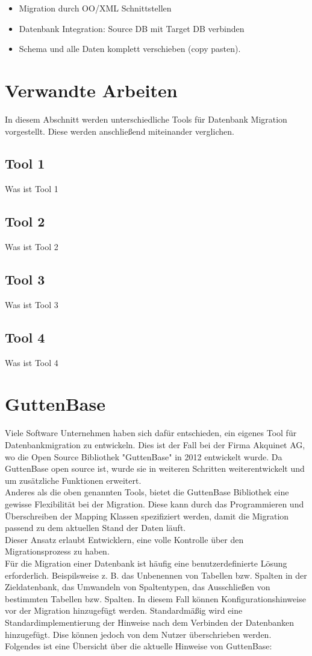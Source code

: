 \begin{itemize}
	\item Migration durch OO/XML Schnittstellen
	\item Datenbank Integration: Source DB mit Target DB verbinden
	\item Schema und alle Daten komplett verschieben (copy pasten).
\end{itemize}


\section{Verwandte Arbeiten}
In diesem Abschnitt werden unterschiedliche Tools für Datenbank Migration vorgestellt. Diese werden anschließend miteinander verglichen.
\subsection{Tool 1}
Was ist Tool 1
\subsection{Tool 2}
Was ist Tool 2
\subsection{Tool 3}
Was ist Tool 3
\subsection{Tool 4}
Was ist Tool 4


\section{GuttenBase}
Viele Software Unternehmen haben sich dafür entschieden, ein eigenes Tool für Datenbankmigration zu entwickeln. Dies ist der Fall bei der Firma Akquinet AG, wo die Open Source Bibliothek "GuttenBase" in 2012 entwickelt wurde. Da GuttenBase open source ist, wurde sie in weiteren Schritten weiterentwickelt und um zusätzliche Funktionen erweitert.\\
Anderes als die oben genannten Tools, bietet die GuttenBase Bibliothek eine gewisse Flexibilität bei der Migration. Diese kann durch das Programmieren und Überschreiben der Mapping Klassen spezifiziert werden, damit die Migration passend zu dem aktuellen Stand der Daten läuft.\\
Dieser Ansatz erlaubt Entwicklern, eine volle Kontrolle über den Migrationsprozess zu haben.\\
Für die Migration einer Datenbank ist häufig eine benutzerdefinierte Lösung erforderlich. Beispilsweise z. B. das Unbenennen von Tabellen bzw. Spalten in der Zieldatenbank, das Umwandeln von Spaltentypen, das Ausschließen von bestimmten Tabellen bzw. Spalten.
In diesem Fall können Konfigurationshinweise vor der Migration hinzugefügt werden. Standardmäßig wird eine Standardimplementierung der Hinweise nach dem Verbinden der Datenbanken hinzugefügt. Dise können jedoch von dem Nutzer überschrieben werden. \\
Folgendes ist eine Übersicht über die aktuelle Hinweise von GuttenBase: \\

